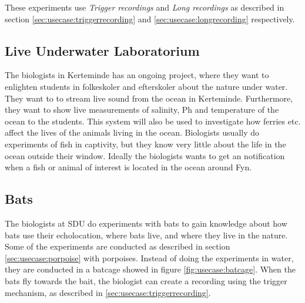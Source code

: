 These experiments use \textit{Trigger recordings} and \textit{Long recordings} as described in section \ref{sec:usecase:triggerrecording} and \ref{sec:usecase:longrecording} respectively.

\subsection{Live Underwater Laboratorium}
The biologists in Kerteminde has an ongoing project, where they want to enlighten students in folkeskoler and efterskoler about the nature under water. They want to to stream live sound from the ocean in Kerteminde. Furthermore, they want to show live measurements of salinity, Ph and temperature of the ocean to the students.
This system will also be used to investigate how ferries etc. affect the lives of the animals living in the ocean. Biologists usually do experiments of fish in captivity, but they know very little about the life in the ocean outside their window. Ideally the biologists wants to get an notification when a fish or animal of interest is located in the ocean around Fyn.


\subsection{Bats}
The biologists at SDU do experiments with bats to gain knowledge about how bats use their echolocation, where bats live, and where they live in the nature.
Some of the experiments are conducted as described in section \ref{sec:usecase:porpoise} with porpoises. Instead of doing the experiments in water, they are conducted in a batcage showed in figure \ref{fig:usecase:batcage}. When the bats fly towards the bait, the biologist can create a recording using the trigger mechanism, as described in \ref{sec:usecase:triggerrecording}.

